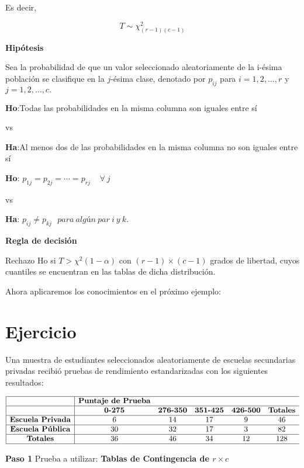 \documentclass[a4paper,oneside,openany]{book}
\begin{document}
Es decir,

\[T\sim \chi^2_{(r-1)(c-1)}\]

\textbf{Hipótesis}

Sea la probabilidad de que un valor seleccionado aleatoriamente de la
i-ésima población se clasifique en la \(j\)-ésima clase, denotado por
\(p_{ij}\) para \(i= 1, 2,\ldots,r\) y \(j=1,2,\ldots,c.\)

\textbf{Ho}:Todas las probabilidades en la misma columna son iguales
entre sí

vs

\textbf{Ha}:Al menos dos de las probabilidades en la misma columna no
son iguales entre sí

\textbf{Ho}: \(p_{1j}=p_{2j}= \cdots=p_{rj} \ \ \ \ \  \forall\  j\)

vs

\textbf{Ha}: \(p_{ij} \neq p_{kj} \ \ \ para\ algún\ par\ i\ y\ k.\)

\textbf{Regla de decisión}

Rechazo Ho si \(T> \chi^2(1-\alpha)\) con \((r-1)\times(c-1)\) grados de
libertad, cuyos cuantiles se encuentran en las tablas de dicha
distribución.

Ahora aplicaremos los conocimientos en el próximo ejemplo:

\section{Ejercicio}\label{ejercicio-1}

Una muestra de estudiantes seleccionados aleatoriamente de escuelas
secundarias privadas recibió pruebas de rendimiento estandarizadas con
los siguientes resultados:

\[
\begin{equation*}
\begin{array}{ |c|cc c c c c|}
\hline
&\textbf{Puntaje de Prueba}&&&&\\
\hline
&\textbf{0-275} & \textbf{276-350} & \textbf{351-425} & \textbf{426-500} & \textbf{Totales} \\
\hline
\textbf{Escuela Privada} & 6    & 14 & 17 & 9 & 46 \\
\hline
\textbf{Escuela Pública} & 30   & 32 & 17 & 3 & 82 \\
\hline
\textbf{Totales} & 36   & 46 & 34 & 12 & 128 \\
\hline
\end{array}
\end{equation*}
\]

\textbf{Paso 1} Prueba a utilizar: \textbf{Tablas de Contingencia de
\(r\times c\)}
\end{document}
